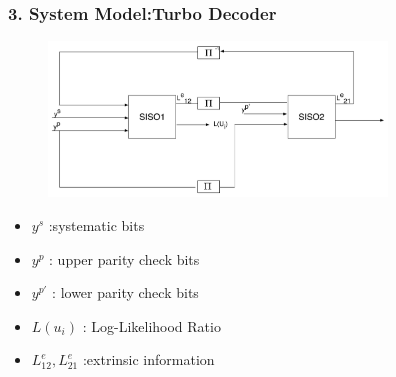 \documentclass{beamer}  %
\begin{document}
\begin{frame}
\frametitle{3. System Model:Turbo Decoder}

\begin{figure}
\centering
		\includegraphics[width=9cm]{TurboDecoder.pdf}
	\end{figure}
\begin{itemize}
\item $y^s$ :systematic bits

\item $y^p$ : upper parity check bits

\item $y^{p'}$ : lower parity check bits

\item $L(u_i)$ : Log-Likelihood Ratio

\item $L^e_{12}, L^e_{21}$ :extrinsic information
\end{itemize}

\end{frame}
\end{document}
